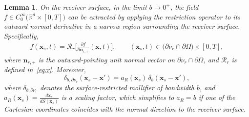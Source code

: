 \documentclass[10pt,a4paper]{amsart}
\newtheorem{lemma}{Lemma}
\newcommand{\bn}{\boldsymbol{n}}
\newcommand{\bx}{\boldsymbol{x}}
\begin{document}
\begin{lemma} \label{lemma:extraction}
On the receiver surface, in the limit $b \to 0^+$, the field $f \in C_0^{\infty}\big(\mathbb{R}^d \times [0,T]\big)$ can be extracted by applying the restriction operator to its outward normal derivative in a narrow region surrounding the receiver surface. Specifically,
\begin{align}
    f(\bx_s, t)
    = \mathcal{R}_r \Big[ \frac{\partial f}{\partial \bn_{r,+}} (\bx, t) \Big],
    \qquad
    (\bx_s, t) \in \big(\partial \nu_r \cap \partial \Omega\big) \times [0,T],
\end{align}
where $\bn_{r,+}$ is the outward-pointing unit normal vector on $\partial \nu_r \cap \partial \Omega$, and $\mathcal{R}_r$ is defined in~\eqref{eq:r}. Moreover,
\[
    \delta_{b,\partial \nu_r}(\bx_s - \bx')
    = a_R(\bx_s) \, \delta_b(\bx_s - \bx'),
\]
where \( \delta_{b,\partial \nu_r} \) denotes the surface-restricted mollifier of bandwidth \( b \), and \( a_R(\bx_s) = \frac{d \bx_s}{dS(\bx_s)} \) is a scaling factor, which simplifies to \( a_R = b \) if one of the Cartesian coordinates coincides with the normal direction to the receiver surface.

\end{lemma}
\end{document}
